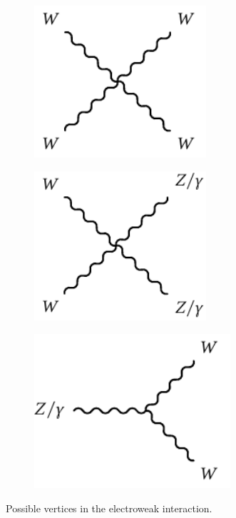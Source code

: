 \begin{figure}
\begin{subfigure}[b]{0.30\linewidth}
	\end{subfigure}
	\par\medskip
	\begin{subfigure}[b]{0.30\linewidth}
		\centering\includegraphics[width=0.7\textwidth]{w_boson_quartic_vertex}
	\end{subfigure}
	\begin{subfigure}[b]{0.30\linewidth}
		\centering\includegraphics[width=0.7\textwidth]{wz_boson_quartic_vertex}
	\end{subfigure}	
	\begin{subfigure}[b]{0.30\linewidth}
		\centering\includegraphics[width=0.8\textwidth]{w_boson_cubic_vertex}
	\end{subfigure}
	\caption{Possible vertices in the electroweak interaction.}
	\label{fig:ewk_vertices}
\end{figure}


